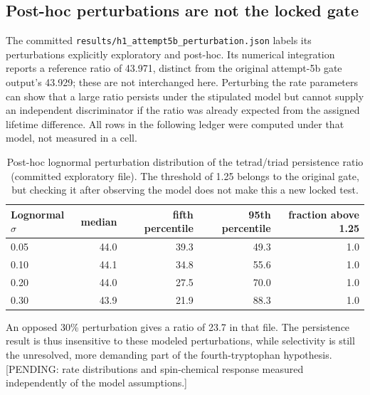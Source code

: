 \subsection{Post-hoc perturbations are not the locked gate}
The committed \texttt{results/h1\_attempt5b\_perturbation.json} labels its perturbations explicitly exploratory and post-hoc. Its numerical integration reports a reference ratio of 43.971, distinct from the original attempt-5b gate output's 43.929; these are not interchanged here. Perturbing the rate parameters can show that a large ratio persists under the stipulated model but cannot supply an independent discriminator if the ratio was already expected from the assigned lifetime difference. All rows in the following ledger were computed under that model, not measured in a cell.
\begin{table}[!htbp]\centering\small\caption{Post-hoc lognormal perturbation distribution of the tetrad/triad persistence ratio (committed exploratory file). The threshold of 1.25 belongs to the original gate, but checking it after observing the model does not make this a new locked test.}\begin{tabular}{lrrrr}\hline Lognormal $\sigma$ & median & fifth percentile & 95th percentile & fraction above 1.25 \\\hline
0.05 & 44.0 & 39.3 & 49.3 & 1.0 \\
0.10 & 44.1 & 34.8 & 55.6 & 1.0 \\
0.20 & 44.0 & 27.5 & 70.0 & 1.0 \\
0.30 & 43.9 & 21.9 & 88.3 & 1.0 \\\hline\end{tabular}\end{table}
An opposed 30\% perturbation gives a ratio of 23.7 in that file. The persistence result is thus insensitive to these modeled perturbations, while selectivity is still the unresolved, more demanding part of the fourth-tryptophan hypothesis. [PENDING: rate distributions and spin-chemical response measured independently of the model assumptions.]
